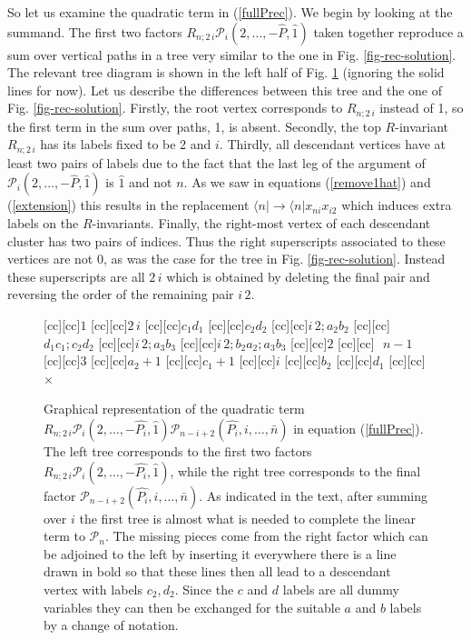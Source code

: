 \documentclass[12pt]{article}
\def\l<{\langle}\def\r>{\rangle}
\begin{document}
{So let us examine the quadratic term in (\ref{fullPrec}). We begin by looking at the summand.
The first two factors $R_{n;2\,i}\mathcal{P}_i(2,\ldots,-\hat{P},\hat{1})$ taken together reproduce a sum over vertical paths in a tree very similar to the one in Fig. \ref{fig-rec-solution}. The relevant tree diagram is shown in the left half of Fig. \ref{fig-rec-product} (ignoring the solid lines for now).
Let us describe the differences between this tree and the one of Fig. \ref{fig-rec-solution}. Firstly, the root vertex corresponds to $R_{n;2\,i}$ instead of 1, so the first term in the sum over paths, 1, is absent. Secondly, the top $R$-invariant $R_{n;2\,i}$ has its labels fixed to be 2 and $i$. Thirdly, all descendant vertices have at least two pairs of labels due to the fact that the last leg of the argument of $\mathcal{P}_i(2,\ldots,-\hat{P},\hat{1})$ is $\hat{1}$ and not $n$. As we saw in equations (\ref{remove1hat}) and (\ref{extension}) this results in the replacement $\l< n| \rightarrow \l< n|x_{ni}x_{i2}$ which induces extra labels on the $R$-invariants. Finally, the right-most vertex of each descendant cluster has two pairs of indices. Thus the right superscripts associated to these vertices are not 0, as was the case for the tree in Fig. \ref{fig-rec-solution}. Instead these superscripts are all $2\,i$ which is obtained by deleting the final pair and reversing the order of the remaining pair $i\,2$.

\begin{figure}
[cc][cc]{$1$}
[cc][cc]{$2\,i$}
[cc][cc]{$c_{1}d_{1}$}
[cc][cc]{$c_{2}d_{2}$}
[cc][cc]{$i\,2;a_{2}b_{2}$}
[cc][cc]{$d_{1}c_{1};c_{2}d_{2}$}
[cc][cc]{$i\,2;a_{3}b_{3}$}
[cc][cc]{$i\,2;b_{2}a_{2};a_{3}b_{3}$}
[cc][cc]{$2$}
[cc][cc]{\,\,\,\,$n-1$}
[cc][cc]{$3$}
[cc][cc]{\!\!$a_{2}+1$}
[cc][cc]{\!\!\!\!\!\!$c_{1}+1$}
[cc][cc]{$i$}
[cc][cc]{$b_{2}$}
[cc][cc]{$d_{1}$}
[cc][cc]{$\times$}
 \centerline{{
}}  \caption[]{\small
  Graphical representation of the quadratic term $R_{n;2\,i} \mathcal{P}_i(2,\ldots,-\hat{P_i},\hat{1}) \mathcal{P}_{n-i+2}(\hat{P_i},i,\ldots,\bar{n})$ in equation (\ref{fullPrec}).
The left tree corresponds to the first two factors $R_{n;2\,i} \mathcal{P}_i(2,\ldots,-\hat{P_i},\hat{1}) $, while the right tree corresponds to the final factor $\mathcal{P}_{n-i+2}(\hat{P_i},i,\ldots,\bar{n})$. As indicated in the text, after summing over $i$ the first tree is almost what is needed to complete the linear term to $\mathcal{P}_n$. The missing pieces come from the right factor which can be adjoined to the left by inserting it everywhere there is a line drawn in bold so that these lines then all lead to a descendant vertex with labels $c_2,d_2$. Since the $c$ and $d$ labels are all dummy variables they can then be exchanged for the suitable $a$ and $b$ labels by a change of notation.}
  \label{fig-rec-product}
\end{figure}


}
\end{document}
